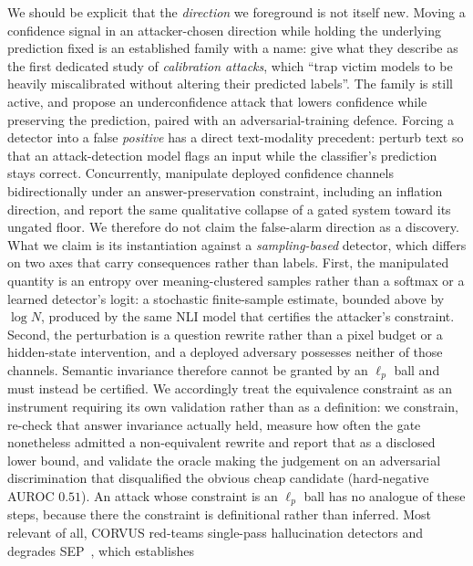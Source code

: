 We should be explicit that the \emph{direction} we foreground is not itself new. Moving a
confidence signal in an attacker-chosen direction while holding the underlying prediction
fixed is an established family with a name: \citet{obadinma2024calibration} give what they
describe as the first dedicated study of \emph{calibration attacks}, which ``trap victim
models to be heavily miscalibrated without altering their predicted labels''. The family is
still active, and \citet{martinezmartinez2026uat} propose an underconfidence attack that
lowers confidence while preserving the prediction, paired with an adversarial-training
defence. Forcing a detector into a false \emph{positive} has a
direct text-modality precedent: \citet{rusert2025redherring} perturb text so that an
attack-detection model flags an input while the classifier's prediction stays correct.
Concurrently, \citet{khanmohammadi2026answerpreserving} manipulate deployed confidence
channels bidirectionally under an answer-preservation constraint, including an inflation
direction, and report the same qualitative collapse of a gated system toward its ungated
floor. We therefore do not claim the false-alarm direction as a discovery. What we claim is
its instantiation against a \emph{sampling-based} detector, which differs on two axes that
carry consequences rather than labels. First, the manipulated quantity is an entropy over
meaning-clustered samples rather than a softmax or a learned detector's logit: a stochastic
finite-sample estimate, bounded above by $\log N$, produced by the same NLI model that
certifies the attacker's constraint. Second, the perturbation is a question rewrite rather
than a pixel budget or a hidden-state intervention, and a deployed adversary possesses
neither of those channels. Semantic invariance therefore cannot be granted by an $\ell_p$
ball and must instead be
certified. We accordingly treat the equivalence constraint as an instrument requiring its
own validation rather than as a definition: we constrain, re-check that answer invariance
actually held, measure how often the gate nonetheless admitted a non-equivalent rewrite and
report that as a disclosed lower bound, and validate the oracle making the judgement on an
adversarial discrimination that disqualified the obvious cheap candidate (hard-negative
AUROC $0.51$). An attack
whose constraint is an $\ell_p$ ball has no analogue of these steps, because there the
constraint is definitional rather than inferred. Most relevant of all, CORVUS red-teams
single-pass hallucination detectors and degrades SEP~\citep{corvus2026}, which establishes
